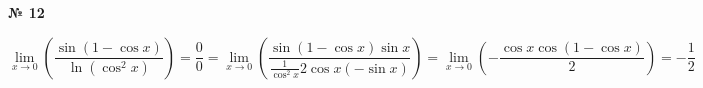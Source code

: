 \documentclass{article}
\begin{document}
\textbf{№ 12} 

\begingroup

$$ \lim\limits_{x \to 0} \left( \frac{\sin{(1-\cos{x})}}{\ln{(\cos^2{x})}} \right)
= \frac{0}{0} 
= \lim\limits_{x \to 0} \left( \frac{\sin{(1-\cos{x})}\sin{x}}{\frac{1}{\cos^2{x}} 2 \cos{x} (-\sin{x})} \right)
= \lim\limits_{x \to 0} \left( - \frac{\cos{x}\cos{(1-\cos{x})}}{2} \right)
= - \frac{1}{2}$$

\endgroup
\end{document}
